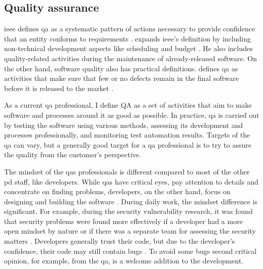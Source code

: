 \subsection{Quality assurance}\label{subsection:quality_assurance}
\gls{ieee} defines \gls{qa} as a systematic pattern of actions necessary to provide confidence that an entity conforms to requirements \cite{ieee1990glossary}. \citeauthor{galin2004software} expands \gls{ieee}'s definition by including non-technical development aspects like scheduling and budget \cite{galin2004software}. He also includes quality-related activities during the maintenance of already-released software. On the other hand, software quality also has practical definitions. \citeauthor{tian2005software} defines \gls{qa} as activities that make sure that few or no defects remain in the final software before it is released to the market \cite{tian2005software}.

As a current \gls{qa} professional, I define QA as a set of activities that aim to make software and processes around it as good as possible. In practice, \gls{qa} is carried out by testing the software using various methods, assessing its development and processes professionally, and monitoring test automation results. Targets of the \gls{qa} can vary, but a generally good target for a \gls{qa} professional is to try to assure the quality from the customer's perspective.

The mindset of the \glspl{qa} professionals is different compared to most of the other \gls{pd} staff, like developers. While \glspl{qa} have critical eyes, pay attention to details and concentrate on finding problems, developers, on the other hand, focus on designing and building the software \cite{olsen2018istqbFoundation}. During daily work, the mindset difference is significant. For example, during the security vulnerability research, it was found that security problems were found more effectively if a developer had a more open mindset by nature or if there was a separate team for assessing the security matters \cite{oliveira2018blindspots}. Developers generally trust their code, but due to the developer's confidence, their code may still contain bugs \cite{beck2000extreme}. To avoid some bugs second critical opinion, for example, from the \gls{qa}, is a welcome addition to the development.

